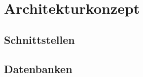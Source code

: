 
\section{Architekturkonzept}
    
    \subsection{Schnittstellen}
    
    \subsection{Datenbanken}



